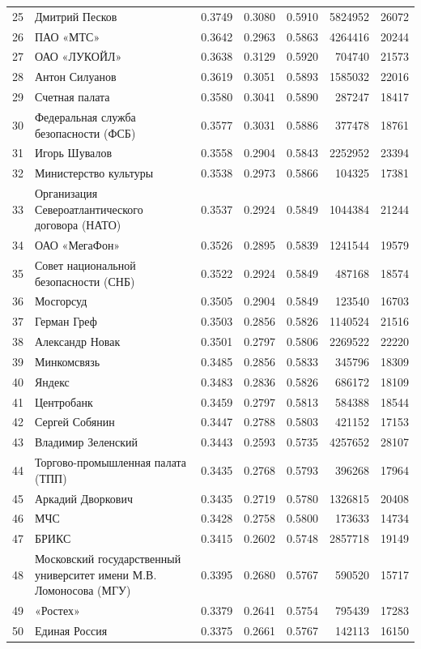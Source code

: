 {\begin{longtable}{r >{\raggedright\arraybackslash}p{4.2cm} S[table-format=1.4] S[table-format=1.4] S[table-format=1.4] r r}
25 & Дмитрий Песков & 0.3749 & 0.3080 & 0.5910 & 5824952 & 26072 \\
26 & ПАО «МТС» & 0.3642 & 0.2963 & 0.5863 & 4264416 & 20244 \\
27 & ОАО «ЛУКОЙЛ» & 0.3638 & 0.3129 & 0.5920 & 704740 & 21573 \\
28 & Антон Силуанов & 0.3619 & 0.3051 & 0.5893 & 1585032 & 22016 \\
29 & Счетная палата & 0.3580 & 0.3041 & 0.5890 & 287247 & 18417 \\
30 & Федеральная служба безопасности (ФСБ) & 0.3577 & 0.3031 & 0.5886 & 377478 & 18761 \\
31 & Игорь Шувалов & 0.3558 & 0.2904 & 0.5843 & 2252952 & 23394 \\
32 & Министерство культуры & 0.3538 & 0.2973 & 0.5866 & 104325 & 17381 \\
33 & Организация Североатлантического договора (НАТО) & 0.3537 & 0.2924 & 0.5849 & 1044384 & 21244 \\
34 & ОАО «МегаФон» & 0.3526 & 0.2895 & 0.5839 & 1241544 & 19579 \\
35 & Совет национальной безопасности (СНБ) & 0.3522 & 0.2924 & 0.5849 & 487168 & 18574 \\
36 & Мосгорсуд & 0.3505 & 0.2904 & 0.5849 & 123540 & 16703 \\
37 & Герман Греф & 0.3503 & 0.2856 & 0.5826 & 1140524 & 21516 \\
38 & Александр Новак & 0.3501 & 0.2797 & 0.5806 & 2269522 & 22220 \\
39 & Минкомсвязь & 0.3485 & 0.2856 & 0.5833 & 345796 & 18309 \\
40 & Яндекс & 0.3483 & 0.2836 & 0.5826 & 686172 & 18109 \\
41 & Центробанк & 0.3459 & 0.2797 & 0.5813 & 584388 & 18544 \\
42 & Сергей Собянин & 0.3447 & 0.2788 & 0.5803 & 421152 & 17153 \\
43 & Владимир Зеленский & 0.3443 & 0.2593 & 0.5735 & 4257652 & 28107 \\
44 & Торгово-промышленная палата (ТПП) & 0.3435 & 0.2768 & 0.5793 & 396268 & 17964 \\
45 & Аркадий Дворкович & 0.3435 & 0.2719 & 0.5780 & 1326815 & 20408 \\
46 & МЧС & 0.3428 & 0.2758 & 0.5800 & 173633 & 14734 \\
47 & БРИКС & 0.3415 & 0.2602 & 0.5748 & 2857718 & 19149 \\
48 & Московский государственный университет имени М.В. Ломоносова (МГУ) & 0.3395 & 0.2680 & 0.5767 & 590520 & 15717 \\
49 & «Ростех» & 0.3379 & 0.2641 & 0.5754 & 795439 & 17283 \\
50 & Единая Россия & 0.3375 & 0.2661 & 0.5767 & 142113 & 16150 \\
\end{longtable}
}
